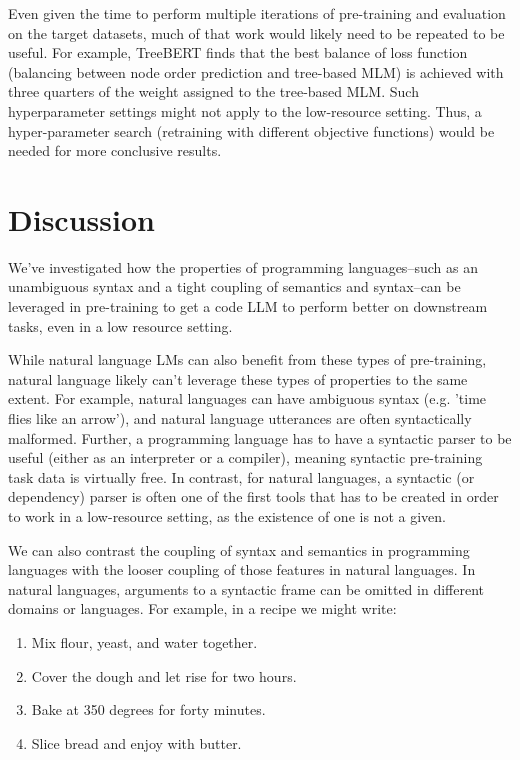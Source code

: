 \documentclass[acmlarge]{acmart}
\begin{document}
Even given the time to perform multiple iterations of pre-training and evaluation on the target datasets, much of that work would likely need to be repeated to be useful. For example, TreeBERT finds that the best balance of loss function (balancing between node order prediction and tree-based MLM) is achieved with three quarters of the weight assigned to the tree-based MLM. Such hyperparameter settings might not apply to the low-resource setting. Thus, a hyper-parameter search (retraining with different objective functions) would be needed for more conclusive results.

\section{Discussion}

We've investigated how the properties of programming languages--such as an unambiguous syntax and a tight coupling of semantics and syntax--can be leveraged in pre-training to get a code LLM to perform better on downstream tasks, even in a low resource setting.

While natural language LMs can also benefit from these types of pre-training, natural language likely can't leverage these types of properties to the same extent. For example, natural languages can have ambiguous syntax (e.g. 'time flies like an arrow'), and natural language utterances are often syntactically malformed. Further, a programming language has to have a syntactic parser to be useful (either as an interpreter or a compiler), meaning syntactic pre-training task data is virtually free. In contrast, for natural languages, a syntactic (or dependency) parser is often one of the first tools that has to be created in order to work in a low-resource setting, as the existence of one is not a given. 

We can also contrast the coupling of syntax and semantics in programming languages with the looser coupling of those features in natural languages. In natural languages, arguments to a syntactic frame can be omitted in different domains or languages. For example, in a recipe we might write:

\begin{enumerate}
  \item Mix flour, yeast, and water together.
  \item Cover the dough and let rise for two hours.
  \item Bake at 350 degrees for forty minutes.
  \item Slice bread and enjoy with butter.
\end{enumerate}
\end{document}
